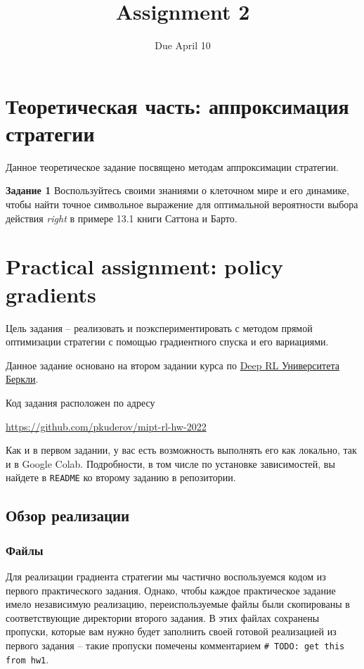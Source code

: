 \documentclass[12pt, oneside]{article}
\author{Due April 10}
\title{Assignment 2}
\date{}
\begin{document}
\maketitle
\thispagestyle{fancy}

\section{Теоретическая часть: аппроксимация стратегии}

Данное теоретическое задание посвящено методам аппроксимации стратегии.

\textbf{Задание 1} Воспользуйтесь своими знаниями о клеточном мире и его динамике, чтобы найти точное символьное выражение для оптимальной вероятности выбора действия \textit{right} в примере 13.1 книги Саттона и Барто.

\section{Practical assignment: policy gradients}

Цель задания -- реализовать и поэкспериментировать с методом прямой оптимизации стратегии с помощью градиентного спуска и его вариациями.

Данное задание основано на втором задании курса по \href{http://rail.eecs.berkeley.edu/deeprlcourse/}{Deep RL Университета Беркли}.

Код задания расположен по адресу
\begin{center}
    \href{https://github.com/pkuderov/mipt-rl-hw-2022}{https://github.com/pkuderov/mipt-rl-hw-2022}
\end{center}

Как и в первом задании, у вас есть возможность выполнять его как локально, так и в Google Colab. Подробности, в том числе по установке зависимостей, вы найдете в \verb|README| ко второму заданию в репозитории.

\subsection{Обзор реализации}

\subsubsection{Файлы}

Для реализации градиента стратегии мы частично воспользуемся кодом из первого практического задания. Однако, чтобы каждое практическое задание имело независимую реализацию, переиспользуемые файлы были скопированы в соответствующие директории второго задания. В этих файлах сохранены пропуски, которые вам нужно будет заполнить своей готовой реализацией из первого задания -- такие пропуски помечены комментарием \verb|# TODO: get this from hw1|.
\end{document}
